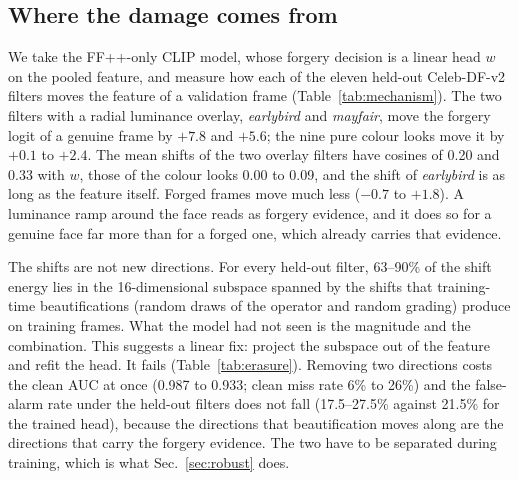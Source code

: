 \subsection{Where the damage comes from}
\label{sec:mechanism}
We take the FF++-only CLIP model, whose forgery decision is a linear head $w$ on the pooled feature, and measure how each
of the eleven held-out Celeb-DF-v2 filters moves the feature of a validation frame (Table~\ref{tab:mechanism}). The two
filters with a radial luminance overlay, \emph{earlybird} and \emph{mayfair}, move the forgery logit of a genuine frame by
$+7.8$ and $+5.6$; the nine pure colour looks move it by $+0.1$ to $+2.4$. The mean shifts of the two overlay filters have
cosines of 0.20 and 0.33 with $w$, those of the colour looks 0.00 to 0.09, and the shift of \emph{earlybird} is as long as
the feature itself. Forged frames move much less ($-0.7$ to $+1.8$). A luminance ramp around the face reads as forgery
evidence, and it does so for a genuine face far more than for a forged one, which already carries that evidence.

The shifts are not new directions. For every held-out filter, 63--90\% of the shift energy lies in the 16-dimensional
subspace spanned by the shifts that training-time beautifications (random draws of the operator and random grading) produce
on training frames. What the model had not seen is the magnitude and the combination. This suggests a linear fix: project
the subspace out of the feature and refit the head. It fails (Table~\ref{tab:erasure}). Removing two directions costs the
clean AUC at once (0.987 to 0.933; clean miss rate 6\% to 26\%) and the false-alarm rate under the held-out filters does not
fall (17.5--27.5\% against 21.5\% for the trained head), because the directions that beautification moves along are the
directions that carry the forgery evidence. The two have to be separated during training, which is what Sec.~\ref{sec:robust}
does.
